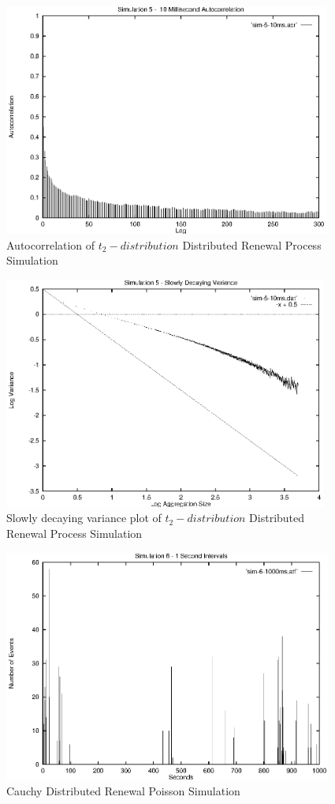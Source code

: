 \begin{figure}
\includegraphics[height=3in]{pics/sim-5-10ms-acr.eps}
\caption{Autocorrelation of $t_2-distribution$ Distributed Renewal Process Simulation}
\label{simulation:sim5.10ms.acr}
\end{figure}

\begin{figure}
\includegraphics[height=3in]{pics/sim-5-10ms-sta.eps}
\caption{Slowly decaying variance plot of $t_2-distribution$ Distributed Renewal Process Simulation}
\label{simulation:sim5.10ms.sta}
\end{figure}


\begin{figure}
\includegraphics[height=3in]{pics/sim-6-1s-freq.eps}
\caption{Cauchy Distributed Renewal Poisson Simulation}
\label{simulation:sim6.1s.freq}
\end{figure}

